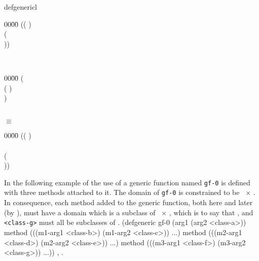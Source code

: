 \begin{optDefinition}
\begin{RewriteTable}{defgeneric}{l}
\begin{minipage}[t]{\linewidth}
\begin{tabbing}
        00\=00\= \kill
        (( ) \\
        \>( \\
        \>\>  ))
    \end{tabbing}
\end{minipage}\\
%
\begin{minipage}[t]{\linewidth}
    \begin{tabbing}
        00\=00\= \kill
        ( \\
        \>( ) \\
        \> )
    \end{tabbing}
\end{minipage}\\
\hspace{2cm}$\equiv$
\begin{minipage}[t]{\linewidth}
    \begin{tabbing}
        00\=00\= \kill
        (( )\\
        \>\\
        \>( \\
        \>\> ))
    \end{tabbing}
\end{minipage}
\end{RewriteTable}
%
\examples
In the following example of the use of  a generic
function named {\tt gf-0} is defined with three methods attached to
it.  The domain of {\tt gf-0} is constrained to be \
$\times$ {\tt <class-a>}.  In consequence, each method added to the
generic function, both here and later (by \macroref{defmethod}), must have
a domain which is a subclass of \classref{object}\ $\times$ {\tt <class-a>},
which is to say that {\tt <class-c>}, {\tt <class-e>} and {\tt
<class-g>} must all be subclasses of {\tt <class-a>}.
%
{\syntax
(defgeneric gf-0 (arg1 (arg2 <class-a>))
  method (((m1-arg1 <class-b>) (m1-arg2 <class-c>)) ...)
  method (((m2-arg1 <class-d>) (m2-arg2 <class-e>)) ...)
  method (((m3-arg1 <class-f>) (m3-arg2 <class-g>)) ...))
\endsyntax}
%
\seealso%
, .


\end{optDefinition}
